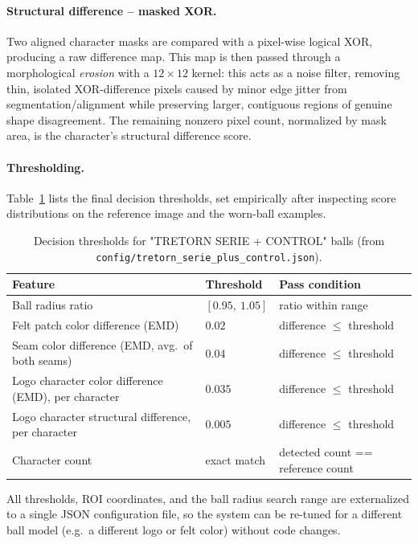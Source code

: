 \documentclass[11pt,a4paper]{article}
\begin{document}
\paragraph{Structural difference -- masked XOR.} Two aligned character
masks are compared with a pixel-wise logical XOR, producing a raw
difference map. This map is then passed through a morphological
\emph{erosion} with a $12\times12$ kernel: this acts as a noise filter,
removing thin, isolated XOR-difference pixels caused by minor edge jitter
from segmentation/alignment while preserving larger, contiguous regions of
genuine shape disagreement. The remaining nonzero pixel count, normalized by mask
area, is the character's structural difference score.

\paragraph{Thresholding.} Table~\ref{tab:thresholds} lists the final
decision thresholds, set empirically after inspecting score
distributions on the reference image and the worn-ball examples.

\begin{table}[H]
\centering
\caption{Decision thresholds for "TRETORN SERIE + CONTROL" balls (from
\texttt{config/tretorn\_serie\_plus\_control.json}).}
\label{tab:thresholds}
\begin{tabular}{@{}lll@{}}
\toprule
\textbf{Feature} & \textbf{Threshold} & \textbf{Pass condition} \\
\midrule
Ball radius ratio & $[0.95,\ 1.05]$ & ratio within range \\
Felt patch color difference (EMD) & $0.02$ & difference $\le$ threshold \\
Seam color difference (EMD, avg.\ of both seams) & $0.04$ & difference $\le$ threshold \\
Logo character color difference (EMD), per character & $0.035$ & difference $\le$ threshold \\
Logo character structural difference, per character & $0.005$ & difference $\le$ threshold \\
Character count & exact match & detected count == reference count \\
\bottomrule
\end{tabular}
\end{table}

All thresholds, ROI coordinates, and the ball radius search range are
externalized to a single JSON configuration file, so the system can be
re-tuned for a different ball model (e.g.\ a different logo or felt color)
without code changes.
\end{document}
